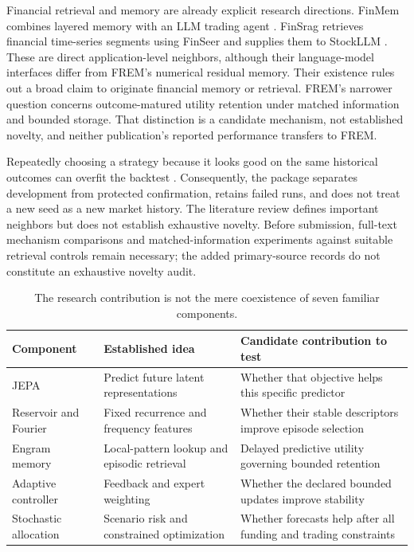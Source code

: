 \documentclass[11pt,a4paper]{article}
\begin{document}
Financial retrieval and memory are already explicit research directions. FinMem combines layered memory with an LLM trading agent \citep{yu2023finmem}. FinSrag retrieves financial time-series segments using FinSeer and supplies them to StockLLM \citep{xiao2025finsrag}. These are direct application-level neighbors, although their language-model interfaces differ from FREM's numerical residual memory. Their existence rules out a broad claim to originate financial memory or retrieval. FREM's narrower question concerns outcome-matured utility retention under matched information and bounded storage. That distinction is a candidate mechanism, not established novelty, and neither publication's reported performance transfers to FREM.

Repeatedly choosing a strategy because it looks good on the same historical outcomes can overfit the backtest \citep{bailey2015}. Consequently, the package separates development from protected confirmation, retains failed runs, and does not treat a new seed as a new market history. The literature review defines important neighbors but does not establish exhaustive novelty. Before submission, full-text mechanism comparisons and matched-information experiments against suitable retrieval controls remain necessary; the added primary-source records do not constitute an exhaustive novelty audit.

\begin{table}[ht]
\centering\small
\begin{tabularx}{\linewidth}{p{.23\linewidth}XX}
\toprule Component & Established idea & Candidate contribution to test \\
\midrule JEPA & Predict future latent representations & Whether that objective helps this specific predictor \\
Reservoir and Fourier & Fixed recurrence and frequency features & Whether their stable descriptors improve episode selection \\
Engram memory & Local-pattern lookup and episodic retrieval & Delayed predictive utility governing bounded retention \\
Adaptive controller & Feedback and expert weighting & Whether the declared bounded updates improve stability \\
Stochastic allocation & Scenario risk and constrained optimization & Whether forecasts help after all funding and trading constraints \\
\bottomrule
\end{tabularx}
\caption{The research contribution is not the mere coexistence of seven familiar components.}
\end{table}
\end{document}
